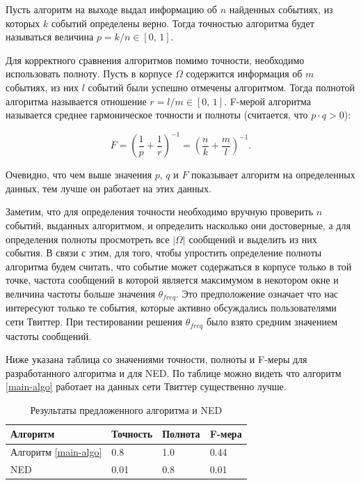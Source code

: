 \documentclass[12pt, a4paper]{article}
\begin{document}
	Пусть алгоритм на выходе выдал информацию об $n$ найденных событиях, из которых $k$ событий определены верно. Тогда точностью алгоритма будет называться величина $p = k/n \in [0,\, 1]$. 
	
	Для корректного сравнения алгоритмов помимо точности, необходимо использовать полноту. Пусть в корпусе $\Omega$ содержится информация об $m$ событиях, из них $l$ событий были успешно отмечены алгоритмом. Тогда полнотой алгоритма называется отношение $r = l/m \in [0,\, 1]$. F-мерой алгоритма называется среднее гармоническое точности и полноты (считается, что $p \cdot q > 0$):
	
	\begin{equation}
	F = \left(\frac{1}{p} + \frac{1}{r}\right)^{-1} = \left( \frac{n}{k} + \frac{m}{l} \right)^{-1}.
	\end{equation}
	
	Очевидно, что чем выше значения $p$, $q$ и $F$ показывает алгоритм на определенных данных, тем лучше он работает на этих данных.
	
	Заметим, что для определения точности необходимо вручную проверить $n$ событий, выданных алгоритмом, и определить насколько они достоверные, а для определения полноты просмотреть все $\vert \Omega \vert$ сообщений и выделить из них события. В связи с этим, для того, чтобы упростить определение полноты алгоритма будем считать, что событие может содержаться в корпусе только в той точке, частота сообщений в которой является максимумом в некотором окне и величина частоты больше значения $\theta_{freq}$. Это предположение означает что нас интересуют только те события, которые активно обсуждались пользователями сети Твиттер. При тестировании решения $\theta_{freq}$ было взято средним значением частоты сообщений.
	
	Ниже указана таблица со значениями точности, полноты и F-меры для разработанного алгоритма и для NED. По таблице можно видеть что алгоритм \ref{main-algo} работает на данных сети Твиттер существенно лучше.
	
	\begin{table}[h]
	\centering
	\caption{Результаты предложенного алгоритма и NED}
	\begin{tabular}{ l l l l}
	Алгоритм & Точность & Полнота & F-мера \\ \hline
	Алгоритм \ref{main-algo} & 0.8 & 1.0 & 0.44 \\ 
	NED & 0.01 & 0.8 & 0.01 \\ 
	\end{tabular}
	
	\label{nuggets-table}
	\end{table}
	
\end{document}
